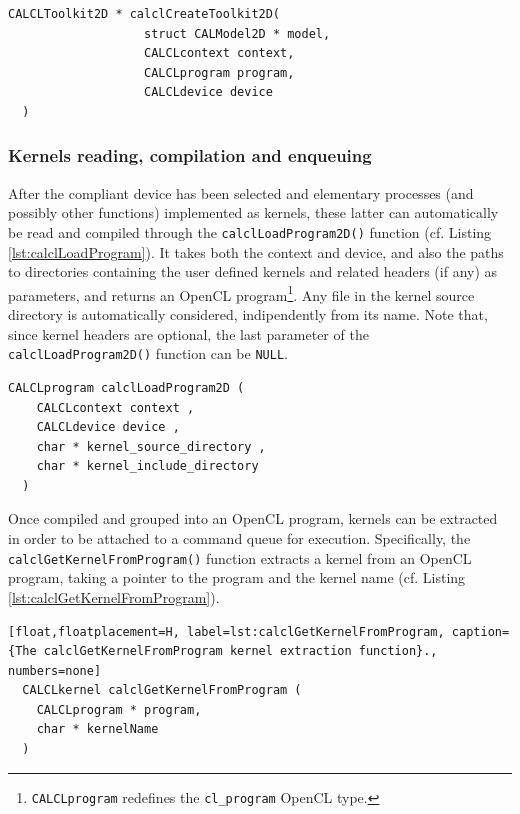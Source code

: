 \begin{lstlisting}[float,floatplacement=H, label=lst:calclCreateToolkit2D, caption=The calclCreateToolkit2D data structure., numbers=none]
  CALCLToolkit2D * calclCreateToolkit2D(
                   struct CALModel2D * model,
                   CALCLcontext context,
                   CALCLprogram program,
                   CALCLdevice device
  )
\end{lstlisting}


\subsubsection{Kernels reading, compilation and enqueuing}

After the compliant device has been selected and elementary processes
(and possibly other functions) implemented as kernels, these latter
can automatically be read and compiled through the
\verb'calclLoadProgram2D()' function (cf. Listing
\ref{lst:calclLoadProgram}). It takes both the context and device, and
also the paths to directories containing the user defined kernels and
related headers (if any) as parameters, and returns an OpenCL
program\footnote{\texttt{CALCLprogram} redefines the
  \texttt{cl\_program} OpenCL type.}. Any file in the kernel source
directory is automatically considered, indipendently from its
name. Note that, since kernel headers are optional, the last parameter
of the \verb'calclLoadProgram2D()' function can be \verb'NULL'.

\begin{lstlisting}[float,floatplacement=H, label=lst:calclLoadProgram, caption={The calclLoadProgramLib function. It loads and compiles kernels by returning an OpenCL program.}, numbers=none]
  CALCLprogram calclLoadProgram2D (
    CALCLcontext context ,
    CALCLdevice device ,
    char * kernel_source_directory ,
    char * kernel_include_directory
  )
\end{lstlisting}

Once compiled and grouped into an OpenCL program, kernels can be
extracted in order to be attached to a command queue for
execution. Specifically, the \verb'calclGetKernelFromProgram()'
function extracts a kernel from an OpenCL program, taking a pointer to
the program and the kernel name (cf. Listing
\ref{lst:calclGetKernelFromProgram}).

\begin{lstlisting}[float,floatplacement=H, label=lst:calclGetKernelFromProgram, caption={The calclGetKernelFromProgram kernel extraction function}., numbers=none]
  CALCLkernel calclGetKernelFromProgram (
    CALCLprogram * program,
    char * kernelName 
  )
\end{lstlisting}

